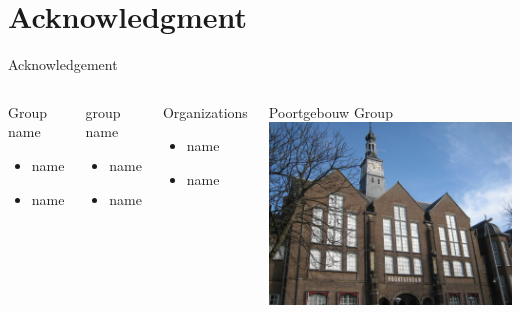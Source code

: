 \documentclass{beamer}
\begin{document}
\section{Acknowledgment}
\begin{frame}{Acknowledgement}
\begin{columns}[onlytextwidth]
\begin{block}{Group name}
\begin{itemize}
\vskip0.5cm
\item name 
\vskip0.5cm
\item name 
\end{itemize}
\vskip1.7cm
~
\end{block}
\vskip1cm 
\begin{block}{group name}
\vskip0.5cm 
\begin{itemize}
\item name
\vskip0.5cm
\item name 
\end{itemize}
\vskip1.7cm
~
\end{block}

\begin{block}{Organizations}
\vskip0.5cm 
\begin{itemize}
\item name 
\vskip0.5cm
\item name 
\vskip0.5cm
\end{itemize}
\end{block}
\vskip1cm
\begin{block}{Poortgebouw Group}
\includegraphics[height=0.4\textheight]{poort.jpg}%
\end{block}
\end{columns}


\end{frame}
\begin{frame}[label={lastframe}]
\end{frame}
\end{document}
